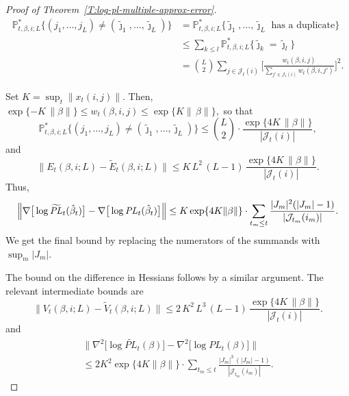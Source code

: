 \documentclass[aoas,preprint]{imsart}
\begin{document}
\begin{proof}[Proof of Theorem~\ref{T:log-pl-multiple-approx-error}]
\begin{align*}
    \mathbb{P}^\ast_{t,\beta,i;L}
    \Big\{
        (j_1, \ldots, j_L)
            \neq
            (\tilde \jmath_1, \ldots, \tilde \jmath_L)
    \Big\}
        &=
        \mathbb{P}^\ast_{t,\beta,i;L}
        \Big\{
            \text{$\tilde \jmath_1, \ldots, \tilde \jmath_L$ has a duplicate}
        \} \\
        &\leq
        \sum_{k \leq l}
            \mathbb{P}^\ast_{t,\beta,i;L}
            \Big\{
                \tilde \jmath_k = \tilde \jmath_l
            \Big\} \\
        &=
            {L \choose 2}
            \sum_{j \in \mathcal{J}_t(i)}
                \Big[
                    \frac{
                        w_t(\beta, i, j)
                    }{
                        \sum_{j' \in \mathcal{J}_t(i)} w_t(\beta, i, j')
                    }
                \Big]^2.
\end{align*}


Set $K = \sup_t \| x_t(i,j) \|$.  Then,
\(
    \exp\{-K \, \| \beta \|\}
        \leq w_t(\beta,i,j)
        \leq \exp\{K \| \, \beta \|\},
\)
so that
\[
    \mathbb{P}^\ast_{t,\beta,i;L}
    \Big\{
        (j_1, \ldots, j_L)
            \neq
            (\tilde \jmath_1, \ldots, \tilde \jmath_L)
    \Big\}
        \leq
        {L \choose 2}
        \cdot
        \frac{\exp\{4 K \, \| \beta \|\}}{| \mathcal{J}_t(i) |},
\]
and
\[
    \Big\| E_{t}(\beta, i; L) - \widetilde{E}_t(\beta, i; L) \Big\|
        \leq
        K \, L^2 \, (L - 1)
        \,
        \frac{\exp\{4 K \, \| \beta \|\}}{| \mathcal{J}_t(i) |}.
\]
Thus,
\[
    \Big\|
        \nabla\big[ \log \widetilde{\mathit{PL}}_t(\hat \beta _t ) \big]
        -
        \nabla\big[ \log {\mathit{PL}}_t(\hat \beta _t ) \big]        
    \Big\| \\
        \leq
            K
            \exp\{4 K \| \beta \|\}
            \cdot
            \sum_{t_m \leq t}
                \frac{|J_m|^2(|J_m| - 1)}{|\mathcal{J}_{t_m}(i_m)|}.
\]
We get the final bound by replacing the numerators of the summands
with $\sup_m |J_m|$.

The bound on the difference in Hessians follows by a similar argument.
The relevant intermediate bounds are
\[
    \Big\| V_{t}(\beta, i; L) - \widetilde{V}_t(\beta, i; L) \Big\|
        \leq
        2\, K^2 \, L^3 \, (L - 1)
        \,
        \frac{\exp\{4 K \, \| \beta \|\}}{| \mathcal{J}_t(i) |}.
\]
and
\begin{multline*}
    \Big\|
        \nabla^2\big[ \log \widetilde{\mathit{PL}}_t(\beta) \big]
        -
        \nabla^2\big[ \log \mathit{PL}_t(\beta) \big]
    \Big\| \\
        \leq
            2K^2
            \exp\{4 K \| \beta \|\}
            \cdot
            \sum_{t_m \leq t}
                \frac{|J_m|^3 \, (|J_m| - 1)}{|\mathcal{J}_{t_m}(i_m)|}.
\end{multline*}
\end{proof}
\end{document}
